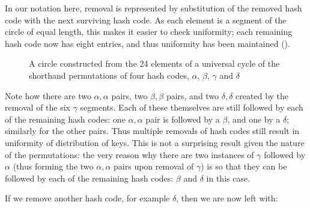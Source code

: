 \documentclass[runningheads,a4paper]{llncs}
\newcommand{\slice}[3]{

  \draw (0,0) -- (#1:1) arc (#1:#2:1);
  \draw (0,0) -- (#1:1.1);

  \node at (#1:1.3) {#3};
}
\begin{document}
\noindent
In our notation here, removal is represented by substitution of the
removed hash code with the next surviving hash code. As each element
is a segment of the circle of equal length, this makes it easier to
check uniformity; each remaining hash code now has eight entries, and
thus uniformity has been maintained
().

\begin{figure}
\begin{center}
\end{center}
\caption{A circle constructed from the 24 elements of a universal
  cycle of the shorthand permutations of four hash codes, $\alpha$,
  $\beta$, $\gamma$ and $\delta$}
\label{fig:circle-perfect-4}
\end{figure}

Note how there are two $\alpha,\alpha$ pairs, two $\beta,\beta$ pairs,
and two $\delta,\delta$ created by the removal of the six $\gamma$
segments. Each of these themselves are still followed by each of the
remaining hash codes: one $\alpha,\alpha$ pair is followed by a
$\beta$, and one by a $\delta$; similarly for the other pairs. Thus
multiple removals of hash codes still result in uniformity of
distribution of keys. This is not a surprising result given the nature
of the permutations: the very reason why there are two instances of
$\gamma$ followed by $\alpha$ (thus forming the two $\alpha,\alpha$
pairs upon removal of $\gamma$) is so that they can be followed by
each of the remaining hash codes: $\beta$ and $\delta$ in this case.

If we remove another hash code, for example $\delta$, then we are now
left with:
\end{document}
